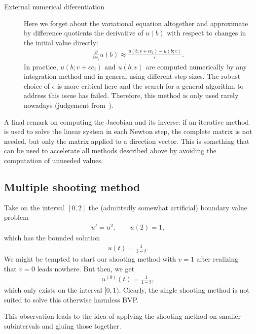 \begin{remark}
\begin{description}
    \item[External numerical diferentiation] Here we forget about the
      variational equation altogether and approximate by difference
      quotients the derivative of $u(b)$ with respect to changes in
      the initial value directly:
      \begin{gather*}
        \frac{\partial}{\partial v_i} u(b)
        \approx \frac{u(b;v+\epsilon e_i) - u(b;v)}{\epsilon}.
      \end{gather*}
In practice, $u(b;v+\epsilon e_i)$ and $u(b;v)$ are computed numerically by any integration method and in general using different step sizes.       The robust choice of $\epsilon$ is more critical here and the
      search for a general algorithm to address this issue has
      failed. Therefore, this method is only used rarely nowadays
      (judgement from~\cite{DeuflhardBornemann08}).
  \end{description}

  A final remark on computing the Jacobian and its inverse: if an
  iterative method is used to solve the linear system in each Newton
  step, the complete matrix is not needed, but only the matrix applied
  to a direction vector. This is something that can be used to
  accelerate all methods described above by avoiding the computation
  of unneeded values.
\end{remark}

\subsection{Multiple shooting method}

\begin{example}
 Take on the interval $[0,2]$ the (admittedly somewhat artificial) boundary value problem
 \begin{gather*}
   u' = u^2,\qquad u(2) = 1,
 \end{gather*}
 which has the bounded solution
 \begin{gather*}
   u(t) = \frac1{3-t}.
 \end{gather*}
 We might be tempted to start our shooting method with $v=1$ after
 realizing that $v=0$ leads nowhere. But then, we get
 \begin{gather*}
   u^{(0)}(t) = \frac1{1-t},
 \end{gather*}
 which only exists on the interval $[0,1)$. Clearly, the single
 shooting method is not suited to solve this otherwise harmless BVP.

 This observation leads to the idea of applying the shooting method on
 smaller subintervals and gluing those together.
\end{example}

